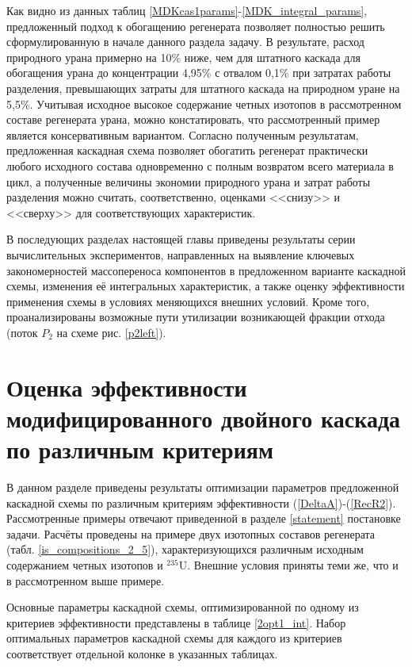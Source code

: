 Как видно из данных таблиц \ref{MDKcas1params}-\ref{MDK_integral_params}, предложенный подход к обогащению регенерата позволяет полностью решить сформулированную в начале данного раздела задачу. В результате, расход природного урана примерно на 10\% ниже, чем для штатного каскада для обогащения урана до концентрации 4,95\% с отвалом 0,1\% при затратах работы разделения, превышающих затраты для штатного каскада на природном уране на 5,5\%. Учитывая исходное высокое содержание четных изотопов в рассмотренном составе регенерата урана, можно констатировать, что рассмотренный пример является консервативным вариантом. Согласно полученным результатам, предложенная каскадная схема позволяет обогатить регенерат практически любого исходного состава одновременно с полным возвратом всего материала в цикл, а полученные величины экономии природного урана и затрат работы разделения можно считать, соответственно, оценками <<снизу>> и <<сверху>> для соответствующих характеристик.

В последующих разделах настоящей главы приведены результаты серии вычислительных экспериментов, направленных на выявление ключевых закономерностей массопереноса компонентов в предложенном варианте каскадной схемы, изменения её интегральных характеристик, а также оценку эффективности применения схемы в условиях меняющихся внешних условий. Кроме того, проанализированы возможные пути утилизации возникающей фракции отхода (поток $P_2$ на схеме рис. \ref{p2left}). 


\section{Оценка эффективности модифицированного двойного каскада по различным критериям}\label{MDKefficiency}

В данном разделе приведены результаты оптимизации параметров предложенной каскадной схемы по различным критериям эффективности (\ref{DeltaA})-(\ref{RecR2}). Рассмотренные примеры отвечают приведенной в разделе \ref{statement} постановке задачи. Расчёты проведены на примере двух изотопных составов регенерата (табл. \ref{is_compositions_2_5}), характеризующихся различным исходным содержанием четных изотопов и $^{235}$U. Внешние условия приняты теми же, что и в рассмотренном выше примере. 

Основные параметры каскадной схемы, оптимизированной по одному из критериев эффективности представлены в таблице \ref{2opt1_int}.
Набор оптимальных параметров каскадной схемы для каждого из критериев соответствует отдельной колонке в указанных таблицах. 

